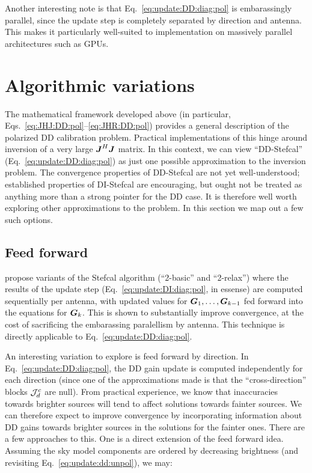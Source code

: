 \documentclass[useAMS,usenatbib]{mn2e}
\newcommand{\mat}[1]{{\bmath{#1}}}
\newcommand{\JJ}{\mat{J}} %
\newcommand{\GG}{\mat{G}}
\newcommand{\JHJ}{\JJ^H\JJ} %
\begin{document}
Another interesting note is that Eq.~\ref{eq:update:DD:diag:pol} is embarassingly parallel, since the update step is 
completely separated by direction and antenna. This makes it particularly well-suited to implementation on massively 
parallel architectures such as GPUs.

\section{Algorithmic variations}

The mathematical framework developed above (in particular, Eqs.~\ref{eq:JHJ:DD:pol}--\ref{eq:JHR:DD:pol}) provides
a general description of the polarized DD calibration problem. Practical implementations of this hinge around inversion of
a very large $\JHJ$ matrix. In this context, we can view ``DD-Stefcal'' (Eq.~\ref{eq:update:DD:diag:pol}) as just one 
possible approximation to the inversion problem. The convergence properties of 
DD-Stefcal are not yet well-understood; established properties of DI-Stefcal \citep{Stefcal} are encouraging, but ought not 
be treated as anything more than a strong pointer for the DD case. It is therefore well worth exploring other approximations to 
the problem. In this section we map out a few such options.

\subsection{Feed forward}
\label{sec:feed-forward}

\citet{Stefcal} propose variants of the Stefcal algorithm (``2-basic'' and ``2-relax'') where the results of the 
update step (Eq.~\ref{eq:update:DI:diag:pol}, in essense) are computed sequentially per antenna, with updated
values for $\GG_1,\dots,\GG_{k-1}$ fed forward into the equations for $\GG_k$. This is shown to 
substantially improve convergence, at the cost of sacrificing the embarassing paralellism by antenna. This technique 
is directly applicable to Eq.~\ref{eq:update:DD:diag:pol}. 

An interesting variation to explore is feed forward by direction. In Eq.~\ref{eq:update:DD:diag:pol}, the DD gain 
update is computed independently for each direction (since one of the approximations made is that the ``cross-direction''
blocks $\mathcal{J}^c_d$ are null). From practical experience, we know that inaccuracies towards brighter 
sources will tend to affect solutions towards fainter sources. We can therefore expect to improve convergence
by incorporating information about DD gains towards brighter sources in the solutions for the fainter ones. There are
a few approaches to this. One is a direct extension of the feed forward idea. Assuming 
the sky model components are ordered by decreasing brightness (and revisiting Eq.~\ref{eq:update:dd:unpol}), we may:
\end{document}
